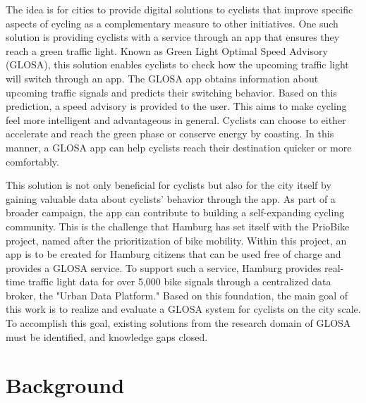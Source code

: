 The idea is for cities to provide digital solutions to cyclists that improve specific aspects of cycling as a complementary measure to other initiatives. One such solution is providing cyclists with a service through an app that ensures they reach a green traffic light. Known as Green Light Optimal Speed Advisory (GLOSA), this solution enables cyclists to check how the upcoming traffic light will switch through an app. The GLOSA app obtains information about upcoming traffic signals and predicts their switching behavior. Based on this prediction, a speed advisory is provided to the user. This aims to make cycling feel more intelligent and advantageous in general. Cyclists can choose to either accelerate and reach the green phase or conserve energy by coasting. In this manner, a GLOSA app can help cyclists reach their destination quicker or more comfortably.

This solution is not only beneficial for cyclists but also for the city itself by gaining valuable data about cyclists' behavior through the app. As part of a broader campaign, the app can contribute to building a self-expanding cycling community. This is the challenge that Hamburg has set itself with the PrioBike project, named after the prioritization of bike mobility. Within this project, an app is to be created for Hamburg citizens that can be used free of charge and provides a GLOSA service. To support such a service, Hamburg provides real-time traffic light data for over 5,000 bike signals through a centralized data broker, the "Urban Data Platform." Based on this foundation, the main goal of this work is to realize and evaluate a GLOSA system for cyclists on the city scale. To accomplish this goal, existing solutions from the research domain of GLOSA must be identified, and knowledge gaps closed. 

\section{Background}

